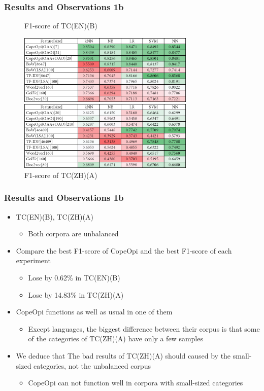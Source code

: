 \documentclass[mathserif]{beamer}
\newcommand\expfigvspace{-2.5ex}
\begin{document}
\begin{frame}
\frametitle{Results and Observations 1b}
	\vspace{\expfigvspace}
	\begin{figure}
	\centering
	\caption{F1-score of TC(EN)(B)}
	\includegraphics[width=0.75\textwidth]{./figure/01B2.png}
	\caption{F1-score of TC(ZH)(A)}
	\includegraphics[width=0.75\textwidth]{./figure/02B1.png}
	\end{figure}
\end{frame}
\begin{frame}
\frametitle{Results and Observations 1b}
	\begin{itemize}
	\item TC(EN)(B), TC(ZH)(A)
		\begin{itemize}
		\item Both corpora are unbalanced
		\end{itemize}
	\item Compare the best F1-score of CopeOpi and the best F1-score of each experiment
		\begin{itemize}
		\item Lose by 0.62\% in TC(EN)(B)
		\item Lose by 14.83\% in TC(ZH)(A)
		\end{itemize}
	\item CopeOpi functions as well as usual in one of them
		\begin{itemize}
		\item Except languages, the biggest difference between their corpus is that some of the categories of TC(ZH)(A) have only a few samples
		\end{itemize}
	\item We deduce that The bad results of TC(ZH)(A) should caused by the small-sized categories, not the unbalanced corpus
		\begin{itemize}
		\item CopeOpi can not function well in corpora with small-sized categories
		\end{itemize}
	\end{itemize}
\end{frame}
\end{document}
